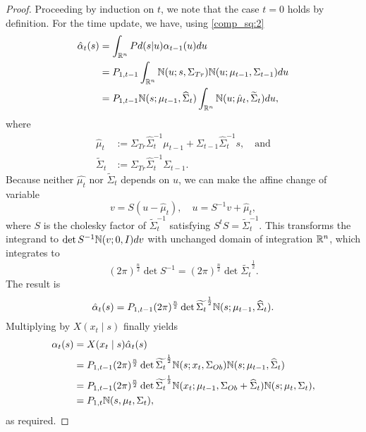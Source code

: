\documentclass[12pt,leqno]{article}
\begin{document}
\begin{proof}

Proceeding by induction on $t$, we note that the case $t = 0$ holds by definition.
For the time update, we have, using \eqref{comp_sq:2}
\begin{align}
  \hat{\alpha}_t(s) &= \int_{{\mathbb R}^n}Pd(s|u)\alpha_{t-1}(u)du \\\notag
  &= P_{1,t-1}\int_{{\mathbb R}^n}{\mathbb N}(u;s,\Sigma_{Tr}){\mathbb N}(u;\mu_{t-1},\Sigma_{t-1})du \notag\\
  &= P_{1,t-1}{\mathbb N}(s;\mu_{t-1},\widehat{\Sigma}_t)\int_{{\mathbb R}^n}{\mathbb N}(u;\hat{\mu}_t,
  \widetilde{\Sigma}_t) du,
\end{align}
where
 \begin{align*}
  \hat{\mu}_t &:= \Sigma_{Tr}\widehat{\Sigma}_t^{-1}\mu_{t-1} +
  \Sigma_{t-1}\widehat{\Sigma}_t^{-1}s, \quad\text{and}\\
  \widetilde{\Sigma}_t &:= \Sigma_{Tr}\widehat{\Sigma}_t^{-1}\Sigma_{t-1}.
  \end{align*}
Because neither $\hat{\mu_t}$ nor $\widetilde{\Sigma}_t$ depends on $u$, we can
make the affine change of variable
$$
v = S(u-\hat{\mu}_t),\quad u = S^{-1}v+\hat{\mu}_t,
$$
where $S$ is the cholesky factor of $\widetilde{\Sigma}_t^{-1}$ satisfying
$S^tS = \widetilde{\Sigma}_t^{-1}$. This transforms the integrand to
  $\det{S}^{-1}{\mathbb N}(v;0,I)dv$
with unchanged domain of integration ${\mathbb R}^n$, which integrates to
$$
(2\pi)^{\frac{n}{2}}\det{S}^{-1} = (2\pi)^{\frac{n}{2}}\det{\widetilde{\Sigma_t}}^{\frac{1}{2}}.
$$
The result is
$$
\hat{\alpha}_t(s) = P_{1,t-1}(2\pi)^{\frac{n}{2}}\det{\widetilde{\Sigma_t}}^{\frac{1}{2}}
{\mathbb N}(s;\mu_{t-1},\widehat{\Sigma}_t).
$$
Multiplying by $X(x_t\mid s)$ finally yields
\begin{align*}
  \alpha_t(s) &= X(x_t\mid s)\hat{\alpha}_t(s) \\
  &= P_{1,t-1}(2\pi)^{\frac{n}{2}}\det{\widetilde{\Sigma_t}}^{\frac{1}{2}}
  {\mathbb N}(s;x_t,\Sigma_{Ob}){\mathbb N}(s;\mu_{t-1},\widehat{\Sigma}_t) \\
  &= P_{1,t-1}(2\pi)^{\frac{n}{2}}\det{\widetilde{\Sigma_t}}^{\frac{1}{2}}
  {\mathbb N}(x_t;\mu_{t-1},\Sigma_{Ob} + \widehat{\Sigma}_t){\mathbb N}(s;\mu_t,\Sigma_t), \\
  &= P_{1,t}{\mathbb N}(s,\mu_t,\Sigma_t),
\end{align*}
as required.
\end{proof}
\end{document}
